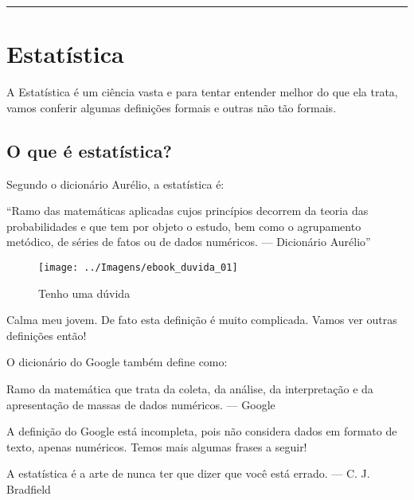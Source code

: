 \documentclass[11pt,]{style/krantz}
\renewenvironment{quote}{\begin{VF}}{\end{VF}}
\theoremstyle{definition}
\theoremstyle{definition}
\theoremstyle{definition}
\theoremstyle{remark}
\begin{document}
\begin{center}\rule{0.5\linewidth}{\linethickness}\end{center}

\mainmatter

\hypertarget{estatistica}{%
\chapter{Estatística}\label{estatistica}}

A Estatística é um ciência vasta e para tentar entender melhor do que ela trata, vamos conferir algumas definições formais e outras não tão formais.

\hypertarget{o-que-e-estatistica}{%
\section{O que é estatística?}\label{o-que-e-estatistica}}

Segundo o dicionário Aurélio, a estatística é:

\begin{quote}
``Ramo das matemáticas aplicadas cujos princípios decorrem da teoria das probabilidades e que tem por objeto o estudo, bem como o agrupamento metódico, de séries de fatos ou de dados numéricos. --- Dicionário Aurélio''
\end{quote}

\begin{figure}[H]

{\centering \texttt{[image: ../Imagens/ebook\_duvida\_01]}

}

\caption{Tenho uma dúvida}\label{fig:fig01}
\end{figure}

Calma meu jovem. De fato esta definição é muito complicada. Vamos ver outras definições então!

O dicionário do Google também define como:

\begin{quote}
Ramo da matemática que trata da coleta, da análise, da interpretação e da apresentação de massas de dados numéricos. --- Google
\end{quote}

A definição do Google está incompleta, pois não considera dados em formato de texto, apenas numéricos. Temos mais algumas frases a seguir!

\begin{quote}
A estatística é a arte de nunca ter que dizer que você está errado. --- C. J. Bradfield
\end{quote}
\end{document}
